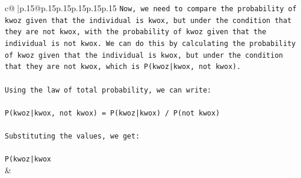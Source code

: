 \documentclass{article}
\begin{document}
{\begin{supertabular}{c@{$\;$}|p{.15\linewidth}@{}p{.15\linewidth}p{.15\linewidth}p{.15\linewidth}p{.15\linewidth}p{.15\linewidth}}
{{{\texttt{Now, we need to compare the probability of kwoz given that the individual is kwox, but under the condition that they are not kwox, with the probability of kwoz given that the individual is not kwox. We can do this by calculating the probability of kwoz given that the individual is kwox, but under the condition that they are not kwox, which is P(kwoz|kwox, not kwox).} \\
\\ 
\texttt{Using the law of total probability, we can write:} \\
\\ 
\texttt{P(kwoz|kwox, not kwox) = P(kwoz|kwox) / P(not kwox)} \\
\\ 
\texttt{Substituting the values, we get:} \\
\\ 
\texttt{P(kwoz|kwox} \\
            }
        }
    }
    & \\ \\


\end{supertabular}}
\end{document}
